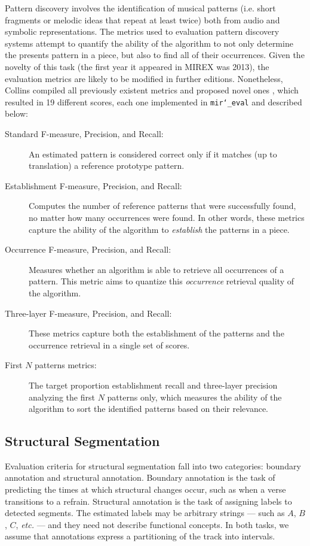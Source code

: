 \documentclass{article}
\def\etc{\emph{etc.}}
\def\mireval{\texttt{mir\char`_eval}}
\begin{document}
Pattern discovery involves the identification of musical patterns (i.e. short fragments or melodic ideas that repeat at least twice) both from audio and symbolic representations.
The metrics used to evaluation pattern discovery systems attempt to quantify the ability of the algorithm to not only determine the presents pattern in a piece, but also to find all of their occurrences.
Given the novelty of this task (the first year it appeared in MIREX was 2013), the evaluation metrics are likely to be modified in further editions.
Nonetheless, Collins compiled all previously existent metrics and proposed novel ones \cite{Collins2013}, which resulted in 19 different scores, each one implemented in \mireval{} and described below:

\begin{description}
\item[Standard F-measure, Precision, and Recall:] An estimated pattern is considered correct only if it matches (up to translation) a reference prototype pattern.
\item[Establishment F-measure, Precision, and Recall:] Computes the number of reference patterns that were successfully found, no matter how many occurrences were found.
      In other words, these metrics capture the ability of the algorithm to \textit{establish} the patterns in a piece.
\item[Occurrence F-measure, Precision, and Recall:] Measures whether an algorithm is able to retrieve all occurrences of a pattern.
      This metric aims to quantize this \textit{occurrence} retrieval quality of the algorithm.
\item[Three-layer F-measure, Precision, and Recall:] These metrics capture both the establishment of the patterns and the occurrence retrieval in a single set of scores.
\item[First $N$ patterns metrics:] The target proportion establishment recall and three-layer precision analyzing the first $N$ patterns only, which measures the ability of the algorithm to sort the identified patterns based on their relevance. 
\end{description}

\subsection{Structural Segmentation}

Evaluation criteria for structural segmentation fall into two categories: boundary annotation and structural annotation.
Boundary annotation is the task of predicting the times at which structural changes occur, such as when a verse transitions to a refrain.
Structural annotation is the task of assigning labels to detected segments.
The estimated labels may be arbitrary strings --- such as $A$, $B$, $C$, \etc{} --- and they need not describe functional concepts.
In both tasks, we assume that annotations express a partitioning of the track into intervals.
\end{document}

